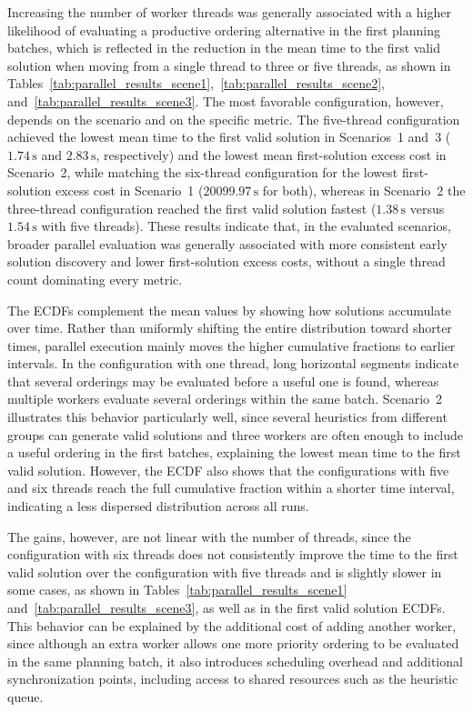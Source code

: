 Increasing the number of worker threads was generally associated with a higher likelihood of
evaluating a productive ordering alternative in the first planning batches, which is reflected in the
reduction in the mean time to the first valid solution when moving from a single thread to three or
five threads, as shown in Tables~\ref{tab:parallel_results_scene1},~\ref{tab:parallel_results_scene2},
and~\ref{tab:parallel_results_scene3}. The most favorable configuration, however, depends on the
scenario and on the specific metric. The five-thread configuration achieved the lowest mean time to
the first valid solution in Scenarios~1 and~3 (\(1.74\,\mathrm{s}\) and \(2.83\,\mathrm{s}\),
respectively) and the lowest mean first-solution excess cost in Scenario~2, while matching the six-thread
configuration for the lowest first-solution excess cost in Scenario~1 (\(20099.97\,\mathrm{s}\) for both),
whereas in Scenario~2 the
three-thread configuration reached the first valid solution fastest (\(1.38\,\mathrm{s}\) versus
\(1.54\,\mathrm{s}\) with five threads). These results indicate that, in the evaluated scenarios,
broader parallel evaluation was generally associated with more consistent early solution discovery and
lower first-solution excess costs, without a single thread count dominating every metric.

The ECDFs complement the mean values by showing how solutions accumulate over time. Rather than
uniformly shifting the entire distribution toward shorter times, parallel execution mainly moves the
higher cumulative fractions to earlier intervals. In the configuration with one thread, long
horizontal segments indicate that several orderings may be evaluated before a useful one is found,
whereas multiple workers evaluate several orderings within the same batch. Scenario~2 illustrates
this behavior particularly well, since several heuristics from different groups can generate valid
solutions and three workers are often enough to include a useful ordering in the first batches,
explaining the lowest mean time to the first valid solution. However, the ECDF also shows that the
configurations with five and six threads reach the full cumulative fraction within a shorter time
interval, indicating a less dispersed distribution across all runs.

The gains, however, are not linear with the number of threads, since the configuration with six
threads does not consistently improve the time to the first valid solution over the configuration
with five threads and is slightly slower in some cases, as shown in
Tables~\ref{tab:parallel_results_scene1} and~\ref{tab:parallel_results_scene3}, as well as in the
first valid solution ECDFs. This behavior can be explained by the additional cost of adding another worker, since although an
extra worker allows one more priority ordering to be evaluated in the same planning batch, it also
introduces scheduling overhead and additional synchronization points, including access to shared
resources such as the heuristic queue.

